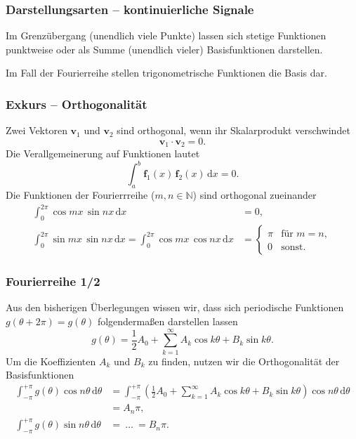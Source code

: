 \begin{frame}
\frametitle{Darstellungsarten {\normalsize -- kontinuierliche Signale}}
Im Grenzübergang (unendlich viele Punkte) lassen sich stetige Funktionen punktweise oder als Summe (unendlich vieler) Basisfunktionen darstellen.

\bigskip



\bigskip

Im Fall der Fourierreihe stellen trigonometrische Funktionen die Basis dar.
\end{frame}

\begin{frame}
\frametitle{Exkurs -- Orthogonalität}
Zwei Vektoren $\mathbf{v}_1$ und $\mathbf{v}_2$ sind orthogonal, 
wenn ihr Skalarprodukt verschwindet
\begin{equation*}
\mathbf{v}_1  \cdot \mathbf{v}_2 =0 .
\end{equation*}
Die Verallgemeinerung auf Funktionen lautet
\begin{equation*}
\int_{a}^{b} \mathbf{f}_1(x)\,\mathbf{f}_2(x)\,\mathrm{d}x =0 .
\end{equation*}
Die Funktionen der Fourierrreihe ($m,n \in \mathbb{N}$) sind orthogonal zueinander
\begin{align*}
\int_{0}^{2\pi} \cos mx\, \sin nx\,\mathrm{d}x &=0,\\
\int_{0}^{2\pi} \sin mx\, \sin nx\,\mathrm{d}x=\int_{0}^{2\pi} \cos mx\, \cos nx\,\mathrm{d}x &=
\left\{\begin{array}{ll}
\pi & \text{für } m=n,\\
0 & \text{sonst}.
\end{array}
 \right.
\end{align*}
\end{frame}

\begin{frame}
\frametitle{Fourierreihe 1/2}
Aus den bisherigen Überlegungen wissen wir, dass sich periodische Funktionen $g(\theta+2\pi)=g(\theta)$ folgendermaßen darstellen lassen
\begin{equation*}
 g(\theta)=\frac{1}{2}A_0 + \sum_{k=1}^{\infty} A_k \cos k\theta + B_k \sin k\theta.
\end{equation*}
Um die Koeffizienten $A_k$ und $B_k$ zu finden, 
nutzen wir die Orthogonalität der Basisfunktionen
\begin{align*}
\int_{-\pi}^{+\pi} g(\theta) \cos n\theta\,\mathrm{d}\theta 
&=\int_{-\pi}^{+\pi} \left(\frac{1}{2}A_0 + \sum_{k=1}^{\infty} A_k \cos k\theta + B_k \sin k\theta\right)  \cos n\theta \,\mathrm{d}\theta \\
&= A_n \pi,\\
\int_{-\pi}^{+\pi} g(\theta) \sin n\theta\,\mathrm{d}\theta 
&=\ \dots \ =B_n \pi.
\end{align*} 

\end{frame}

